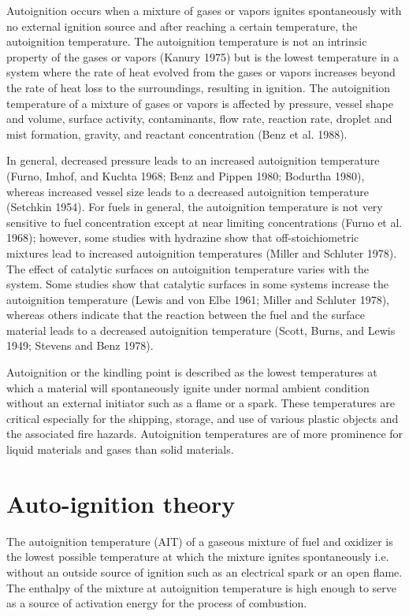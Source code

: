 \documentclass[a4paper,11pt]{article}
\begin{document}
	Autoignition occurs when a mixture of gases or vapors ignites spontaneously with no external ignition source and after reaching a certain temperature, the autoignition temperature. The autoignition temperature is not an intrinsic property of the gases or vapors (Kanury 1975) but is the lowest temperature in a system where the rate of heat evolved from the gases or vapors increases beyond the rate of heat loss to the surroundings, resulting in ignition. The autoignition temperature of a mixture of gases or vapors is affected by pressure, vessel shape and volume, surface activity, contaminants, flow rate, reaction rate, droplet and mist formation, gravity, and reactant concentration (Benz et al. 1988). \par
	In general, decreased pressure leads to an increased autoignition temperature (Furno, Imhof, and Kuchta 1968; Benz and Pippen 1980; Bodurtha 1980), whereas increased vessel size leads to a decreased autoignition temperature (Setchkin 1954). For fuels in general, the autoignition temperature is not very sensitive to fuel concentration except at near limiting concentrations (Furno et al. 1968); however, some studies with hydrazine show that off-stoichiometric mixtures lead to increased autoignition temperatures (Miller and Schluter 1978). The effect of catalytic surfaces on autoignition temperature varies with the system. Some studies show that catalytic surfaces in some systems increase the autoignition temperature (Lewis and von Elbe 1961; Miller and Schluter 1978), whereas others indicate that the reaction between the fuel and the surface material leads to a decreased autoignition temperature (Scott, Burns, and Lewis 1949; Stevens and Benz 1978).\par
	Autoignition or the kindling point is described as the lowest temperatures at which a material will spontaneously ignite under normal ambient condition without an external initiator such as a flame or a spark. These temperatures are critical especially for the shipping, storage, and use of various plastic objects and the associated fire hazards. Autoignition temperatures are of more prominence for liquid materials and gases than solid materials.

     \section{Auto-ignition theory}
     
    The autoignition temperature (AIT) of a gaseous mixture of fuel and oxidizer is the lowest possible temperature at which the mixture ignites spontaneously i.e. without an outside source of ignition such as an electrical spark or an open flame. The enthalpy of the mixture at autoignition temperature is high enough to serve as a source of activation energy for the process of combustion. \par
    
\end{document}
